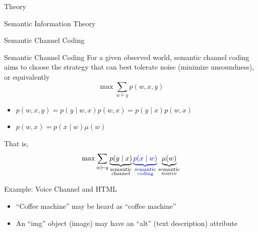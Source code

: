 \documentclass[presentation,mathserif,9pt]{beamer}
\begin{document}
\begin{section}{Theory}
\begin{subsection}{Semantic Information Theory}
		\begin{frame}{Semantic Channel Coding}
			\begin{alertblock}{Semantic Channel Coding}
				For a given observed world, semantic channel coding aims to choose the strategy that can best tolerate noise (minimize unsoundness), or equivalently
				\begin{equation}
					\max \sum_{w \models y} p(w,x,y)
				\end{equation}
			\end{alertblock}
			\begin{itemize}
				\item $p(w,x,y)=p(y \mid w,x)p(w,x)=p(y \mid x)p(w,x)$
				\item $p(w,x)=p(x \mid w)\mu(w)$
			\end{itemize}
			\singlespacing
			That is,
			\begin{equation}
				\max \sum_{w \models y} \underbrace{p(y \mid x)}_{\substack{\text{semantic}\\\text{channel}}} {\color{blue} \underbrace{p(x \mid w)}_{\substack{\text{semantic}\\\text{coding}}}} \underbrace{\mu(w)}_{\substack{\text{semantic}\\\text{source}}}
			\end{equation}
			\begin{exampleblock}{Example: Voice Channel and HTML}
				\begin{itemize}
					\item ``Coffee machine'' may be heard as ``coffee machine''
					\item An ``img'' object (image) may have an ``alt'' (text description) attribute
				\end{itemize}
			\end{exampleblock}
		\end{frame}


\end{subsection}
\end{section}
\end{document}
